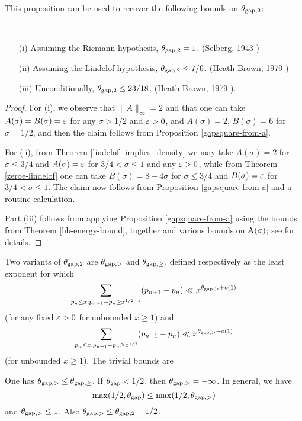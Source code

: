 This proposition can be used to recover the following bounds on $\theta_{\mathrm{gap},2}$:

\begin{corollary}\
    \begin{itemize}
    \item[(i)] Assuming the Riemann hypothesis, $\theta_{\mathrm{gap},2} = 1$. (Selberg, 1943 \cite{selberg_1943})
    \item[(ii)] Assuming the Lindelof hypothesis, $\theta_{\mathrm{gap},2} \leq 7/6$. (Heath-Brown, 1979 \cite{heath_brown_consecutive_II})
    \item[(iii)] Unconditionally, $\theta_{\mathrm{gap},2} \leq 23/18$. (Heath-Brown, 1979 \cite{heath_brown_consecutive_III}).
\end{itemize}
\end{corollary}

\begin{proof} For (i), we observe that $\|A\|_\infty=2$ and that one can take $A(\sigma)=B(\sigma)=\varepsilon$ for any $\sigma>1/2$ and $\varepsilon>0$, and $A(\sigma)=2$, $B(\sigma)=6$ for $\sigma=1/2$, and then the claim follows from Proposition \ref{gapsquare-from-a}.

For (ii), from Theorem \ref{lindelof_implies_density} we may take $A(\sigma)=2$ for $\sigma \leq 3/4$ and $A(\sigma)=\varepsilon$ for $3/4 < \sigma \leq 1$ and any $\varepsilon>0$, while from Theorem \ref{zeroe-lindelof} one can take $B(\sigma) = 8-4\sigma$ for $\sigma \leq 3/4$ and $B(\sigma)=\varepsilon$ for $3/4 < \sigma \leq 1$.  The claim now follows from Proposition \ref{gapsquare-from-a} and a routine calculation.

Part (iii) follows from applying Proposition \ref{gapsquare-from-a} using the bounds from Theorem \ref{hb-energy-bound}, together and various bounds on $\mathrm{A}(\sigma)$; see \cite[Theorem 12.14]{ivic} for details. 
\end{proof}

Two variants of $\theta_{\mathrm{gap},2}$ are $\theta_{\mathrm{gap},>}$ and $\theta_{\mathrm{gap},\geq}$, defined respectively as the least exponent for which
$$ \sum_{p_n \leq x: p_{n+1}-p_n \geq x^{1/2+\varepsilon}} (p_{n+1}-p_n) \ll x^{\theta_{\mathrm{gap},>}+o(1)}$$
(for any fixed $\varepsilon>0$ for unbounded $x \geq 1$) and
$$ \sum_{p_n \leq x: p_{n+1}-p_n \geq x^{1/2}} (p_{n+1}-p_n) \ll x^{\theta_{\mathrm{gap},\geq}+o(1)}$$
(for unbounded $x \geq 1$).  The trivial bounds are

\begin{proposition}\label{trivial-large-gap}  One has $\theta_{\mathrm{gap},>} \le \theta_{\mathrm{gap},\geq}$. If $\theta_{\mathrm{gap}} < 1/2$, then $\theta_{\mathrm{gap},>} = -\infty$.  In general, we have
    $$ \max(1/2,\theta_{\mathrm{gap}}) \leq \max(1/2, \theta_{\mathrm{gap},>})$$
    and $\theta_{\mathrm{gap},>} \leq 1$.  Also $\theta_{\mathrm{gap},>} \leq \theta_{\mathrm{gap},2} - 1/2$.
\end{proposition}

